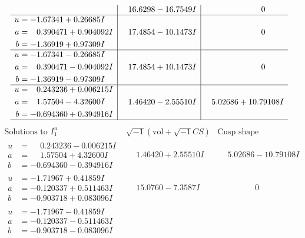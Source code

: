 \documentclass[1p]{elsarticle_modified}
\theoremstyle{definition}
\newcommand{\I}{\sqrt{-1}}
\begin{document}
$$\begin{array}{c|c|c}
 & \phantom{-}16.6298 - 16.7549 I & \phantom{-0.000000 } 0 \\ \hline\begin{aligned}
u &= -1.67341 + 0.26685 I \\
a &= \phantom{-}0.390471 + 0.904092 I \\
b &= -1.36919 + 0.97309 I\end{aligned}
 & \phantom{-}17.4854 - 10.1473 I & \phantom{-0.000000 } 0 \\ \hline\begin{aligned}
u &= -1.67341 - 0.26685 I \\
a &= \phantom{-}0.390471 - 0.904092 I \\
b &= -1.36919 - 0.97309 I\end{aligned}
 & \phantom{-}17.4854 + 10.1473 I & \phantom{-0.000000 } 0 \\ \hline\begin{aligned}
u &= \phantom{-}0.243236 + 0.006215 I \\
a &= \phantom{-}1.57504 - 4.32600 I \\
b &= -0.694360 + 0.394916 I\end{aligned}
 & \phantom{-}1.46420 - 2.55510 I & \phantom{-}5.02686 + 10.79108 I\\
 \hline 
 \end{array}$$\newpage$$\begin{array}{c|c|c}  
\text{Solutions to }I^u_{1}& \I (\text{vol} + \sqrt{-1}CS) & \text{Cusp shape}\\
 \hline 
\begin{aligned}
u &= \phantom{-}0.243236 - 0.006215 I \\
a &= \phantom{-}1.57504 + 4.32600 I \\
b &= -0.694360 - 0.394916 I\end{aligned}
 & \phantom{-}1.46420 + 2.55510 I & \phantom{-}5.02686 - 10.79108 I \\ \hline\begin{aligned}
u &= -1.71967 + 0.41859 I \\
a &= -0.120337 + 0.511463 I \\
b &= -0.903718 + 0.083096 I\end{aligned}
 & \phantom{-}15.0760 - 7.3587 I & \phantom{-0.000000 } 0 \\ \hline\begin{aligned}
u &= -1.71967 - 0.41859 I \\
a &= -0.120337 - 0.511463 I \\
b &= -0.903718 - 0.083096 I\end{aligned}

\end{array}$$
\end{document}
